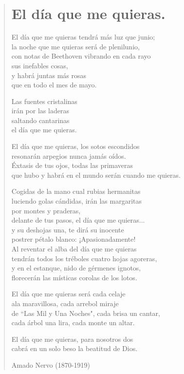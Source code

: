 \documentclass[12pt, twoside]{book}
\begin{document}
\begin{verse}
\begin{center}
\section{El día que me quieras.}
\end{center}
El día que me quieras tendrá más luz que junio;\\
la noche que me quieras será de plenilunio,\\
con notas de Beethoven vibrando en cada rayo\\
sus inefables cosas,\\
y habrá juntas más rosas\\
que en todo el mes de mayo.\newline

Las fuentes cristalinas\\
irán por las laderas\\
saltando cantarinas\\
el día que me quieras.\newline

El día que me quieras, los sotos escondidos\\
resonarán arpegios nunca jamás oídos.\\
Éxtasis de tus ojos, todas las primaveras\\
que hubo y habrá en el mundo serán cuando me quieras.\newline

Cogidas de la mano cual rubias hermanitas\\
luciendo golas cándidas, irán las margaritas\\
por montes y praderas,\\
delante de tus pasos, el día que me quieras...\\
y su deshojas una, te dirá su inocente\\
postrer pétalo blanco: ¡Apasionadamente!\\
Al reventar el alba del día que me quieras\\
tendrán todos los tréboles cuatro hojas agoreras,\\
y en el estanque, nido de gérmenes ignotos,\\
florecerán las místicas corolas de los lotos.\newpage

El día que me quieras será cada celaje\\
ala maravillosa, cada arrebol miraje\\
de ``Las Mil y Una Noches", cada brisa un cantar,\\
cada árbol una lira, cada monte un altar.\newline

El día que me quieras, para nosotros dos\\
cabrá en un solo beso la beatitud de Dios.\newline

Amado Nervo (1870-1919)
\end{verse}
\newpage
\end{document}
